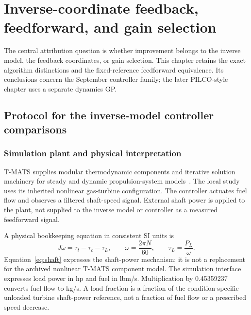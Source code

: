 \chapter{Inverse-coordinate feedback, feedforward, and gain selection}
\label{ch:inverse}
The central attribution question is whether improvement belongs to the inverse model, the feedback coordinates, or gain selection. This chapter retains the exact algorithm distinctions and the fixed-reference feedforward equivalence. Its conclusions concern the September controller family; the later PILCO-style chapter uses a separate dynamics GP.

\section{Protocol for the inverse-model controller comparisons}
\subsection{Simulation plant and physical interpretation}
T-MATS supplies modular thermodynamic components and iterative solution machinery for steady and dynamic propulsion-system models~\cite{tmats,tmatscode}. The local study uses its inherited nonlinear gas-turbine configuration. The controller actuates fuel flow and observes a filtered shaft-speed signal. External shaft power is applied to the plant, not supplied to the inverse model or controller as a measured feedforward signal.

A physical bookkeeping equation in consistent SI units is
\begin{equation}
J\dot\omega=\tau_t-\tau_c-\tau_L,\qquad \omega=\frac{2\pi N}{60},\qquad \tau_L=\frac{P_L}{\omega}.
\label{eq:shaft}
\end{equation}
Equation~\eqref{eq:shaft} expresses the shaft-power mechanism; it is not a replacement for the archived nonlinear T-MATS component model. The simulation interface expresses load power in hp and fuel in lbm/s. Multiplication by 0.45359237 converts fuel flow to kg/s. A load fraction is a fraction of the condition-specific unloaded turbine shaft-power reference, not a fraction of fuel flow or a prescribed speed decrease.

